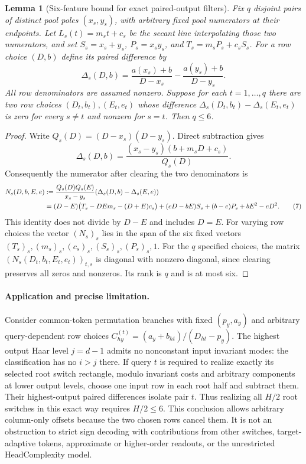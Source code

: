 \documentclass[11pt]{article}
\newtheorem{lemma}{Lemma}
\begin{document}
\begin{lemma}[Six-feature bound for exact paired-output filters]
Fix $q$ disjoint pairs of distinct pool poles $(x_s,y_s)$, with
arbitrary fixed pool numerators at their endpoints. Let
$L_s(t)=m_st+c_s$ be the secant line interpolating those two numerators,
and set $S_s=x_s+y_s$, $P_s=x_sy_s$, and
$T_s=m_sP_s+c_sS_s$. For a row choice $(D,b)$ define its paired
difference by
\[
 \Delta_s(D,b)=\frac{a(x_s)+b}{D-x_s}
                         -\frac{a(y_s)+b}{D-y_s}.
\]
All row denominators are assumed nonzero. Suppose for each
$t=1,\ldots,q$ there are two row choices $(D_t,b_t),(E_t,e_t)$
whose difference $\Delta_s(D_t,b_t)-\Delta_s(E_t,e_t)$ is zero for
every $s\ne t$ and nonzero for $s=t$. Then $q\leq6$.
\end{lemma}
\begin{proof}
Write $Q_s(D)=(D-x_s)(D-y_s)$. Direct subtraction gives
\[
 \Delta_s(D,b)=\frac{(x_s-y_s)(b+m_sD+c_s)}{Q_s(D)}.
\]
Consequently the numerator after clearing the two denominators is
\begin{align*}
 N_s(D,b,E,e)
 &:={Q_s(D)Q_s(E)\over x_s-y_s}
               (\Delta_s(D,b)-\Delta_s(E,e))\\
 &=(D-E)\bigl(T_s-DEm_s-(D+E)c_s\bigr)
       +(eD-bE)S_s+(b-e)P_s+bE^2-eD^2.                \tag{7}
\end{align*}
This identity does not divide by $D-E$ and includes $D=E$.
For varying row choices the vector $(N_s)_s$ lies in the span of
the six fixed vectors $(T_s)_s,(m_s)_s,(c_s)_s,(S_s)_s,(P_s)_s,1$.
For the $q$ specified choices, the matrix $(N_s(D_t,b_t,E_t,e_t))_{t,s}$
is diagonal with nonzero diagonal, since clearing preserves all zeros
and nonzeros. Its rank is $q$ and is at most six.
\end{proof}

\paragraph{Application and precise limitation.}
Consider common-token permutation branches with fixed $(p_y,a_y)$ and
arbitrary query-dependent row choices
$C^{(t)}_{hy}=(a_y+b_{ht})/(D_{ht}-p_y)$. The highest output Haar
level $j=d-1$ admits no nonconstant input invariant modes: the
classification has no $i>j$ there. If query $t$ is required to realize
exactly its selected root switch rectangle, modulo invariant costs
and arbitrary components at lower output levels, choose one input
row in each root half and subtract them. Their highest-output paired
differences isolate pair $t$. Thus realizing all $H/2$ root switches
in this exact way requires $H/2\leq6$.
This conclusion allows arbitrary column-only offsets because the
two chosen rows cancel them. It is not an obstruction to strict sign
decoding with contributions from other switches, target-adaptive
tokens, approximate or higher-order readouts, or the unrestricted
HeadComplexity model.
\end{document}
